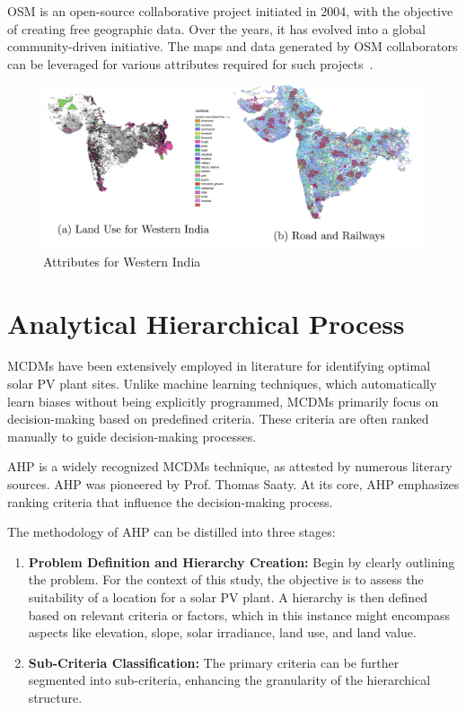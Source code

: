 \documentclass[a4paper,12pt]{Classes/RoboticsLaTeX}
\begin{document}
	\ac{OSM} is an open-source collaborative project initiated in 2004, with the objective of creating free geographic data. Over the years, 
	it has evolved into a global community-driven initiative. The maps and data generated by OSM collaborators can be leveraged for various attributes required 
	for such projects~\cite{openstreetmap2017}.
	\begin{figure}[H]
		\centering
		\includegraphics[width=1\textwidth]{Figures/Other attributes.png} %
		\caption{Attributes for Western India}
		\label{fig:my_label5} %
	\end{figure}

	\section{Analytical Hierarchical Process}

	\ac{MCDMs} have been extensively employed in literature for identifying optimal solar PV plant sites. 
	Unlike machine learning techniques, which automatically learn biases without being explicitly programmed, \ac{MCDMs} primarily focus on decision-making based on predefined criteria. 
	These criteria are often ranked manually to guide decision-making processes.

	\ac{AHP} is a widely recognized \ac{MCDMs} technique, as attested by numerous literary sources\cite{colak2020,saraswat2021,garni2017,zoghi2017}. 
	\ac{AHP} was pioneered by Prof. Thomas Saaty\cite{saaty1988}. At its core, \ac{AHP} emphasizes ranking criteria that influence the decision-making process. 

	The methodology of \ac{AHP} can be distilled into three stages:

	\begin{enumerate}
		\item \textbf{Problem Definition and Hierarchy Creation:} Begin by clearly outlining the problem. For the context of this study, the objective is to assess the suitability of a location for a solar PV plant. A hierarchy is then defined based on relevant criteria or factors, which in this instance might encompass aspects like elevation, slope, solar irradiance, land use, and land value.
		
		\item \textbf{Sub-Criteria Classification:} The primary criteria can be further segmented into sub-criteria, enhancing the granularity of the hierarchical structure.
		
	\end{enumerate}
\end{document}
